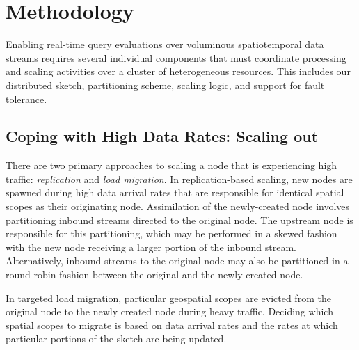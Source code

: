 \section{Methodology}
\label{sec:methodology}
Enabling real-time query evaluations over voluminous spatiotemporal data streams requires several individual components that must coordinate processing and scaling activities over a cluster of heterogeneous resources. This includes our distributed sketch, partitioning scheme, scaling logic, and support for fault tolerance.





\subsection{Coping with High Data Rates: Scaling out}
\label{subsec:scaling-out}
There are two primary approaches to scaling a node that is experiencing high traffic: \emph{replication} and \emph{load migration}. In replication-based scaling, new nodes are spawned during high data arrival rates that are responsible for identical spatial scopes as their originating node. Assimilation of the newly-created node involves partitioning inbound streams directed to the original node. The upstream node is responsible for this partitioning, which may be performed in a skewed fashion with the new node receiving a larger portion of the inbound stream.  Alternatively, inbound streams to the original node may also be partitioned in a round-robin fashion between the original and the newly-created node.

In targeted load migration, particular geospatial scopes are evicted from the original node to the newly created node during heavy traffic. Deciding which spatial scopes to migrate is based on data arrival rates and the rates at which particular portions of the sketch are being updated.


